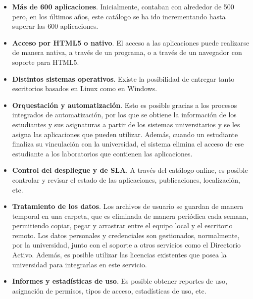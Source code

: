 \begin{itemize}
    \item \textbf{Más de 600 aplicaciones}. Inicialmente, contaban con alrededor de 500 pero, en los últimos años, este catálogo se ha ido incrementando hasta superar las 600 aplicaciones.
    
    \item \textbf{Acceso por HTML5 o nativo}. El acceso a las aplicaciones puede realizarse de manera nativa, a través de un programa, o a través de un navegador con soporte para HTML5.
    
    \item \textbf{Distintos sistemas operativos}. Existe la posibilidad de entregar tanto escritorios basados en Linux como en Windows.
    
    \item \textbf{Orquestación y automatización}. Esto es posible gracias a los procesos integrados de automatización, por los que se obtiene la información de los estudiantes y sus asignaturas a partir de los sistemas universitarios y se les asigna las aplicaciones que pueden utilizar. Además, cuando un estudiante finaliza su vinculación con la universidad, el sistema elimina el acceso de ese estudiante a los laboratorios que contienen las aplicaciones.
    
    \item \textbf{Control del despliegue y de \acf{SLA}}. A través del catálogo online, es posible controlar y revisar el estado de las aplicaciones, publicaciones, localización, etc.
    
    \item \textbf{Tratamiento de los datos}. Los archivos de usuario se guardan de manera temporal en una carpeta, que es eliminada de manera periódica cada semana, permitiendo copiar, pegar y arrastrar entre el equipo local y el escritorio remoto. Los datos personales y credenciales son gestionados, normalmente, por la universidad, junto con el soporte a otros servicios como el Directorio Activo. Además, es posible utilizar las licencias existentes que posea la universidad para integrarlas en este servicio.
    
    \item \textbf{Informes y estadísticas de uso}. Es posible obtener reportes de uso, asignación de permisos, tipos de acceso, estadísticas de uso, etc.
\end{itemize}

\clearpage

